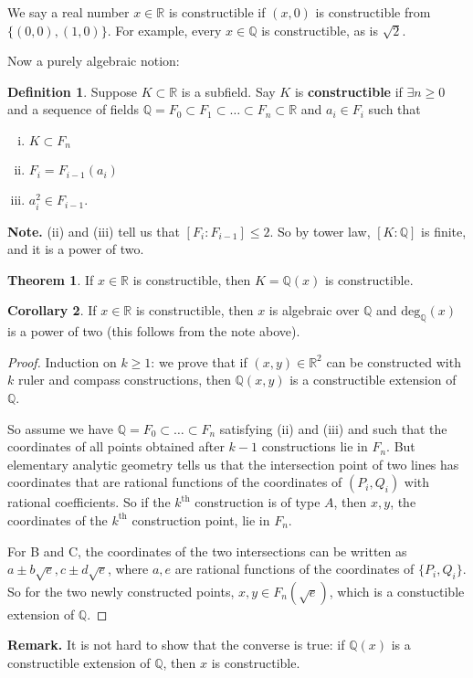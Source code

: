 \documentclass{article}
\theoremstyle{definition}
\newtheorem{theorem}{Theorem}[section]
\newtheorem{cor}[theorem]{Corollary}
\newtheorem{defn}{Definition}[section]
\begin{document}
We say a real number $x \in \mathbb{R}$ is constructible if $(x,0)$ is constructible from $\{(0,0),(1,0)\}$. For example, every $x \in \mathbb{Q}$ is constructible, as is $\sqrt{2}$.
\vspace{1mm}

Now a purely algebraic notion:
\begin{defn}
    Suppose $K \subset \mathbb{R}$ is a subfield. Say $K$ is \textbf{constructible}  if $\exists n\ge 0$ and a sequence of fields $\mathbb{Q}=F_0 \subset F_1 \subset \ldots\subset F_n \subset \mathbb{R}$ and $a_i \in F_i$ such that
    \begin{enumerate}[(i)]
        \item $K \subset F_n$
        \item $F_i = F_{i-1}(a_i)$
        \item $a_i^2 \in F_{i-1}$.
    \end{enumerate}
\end{defn}
\textbf{Note.} (ii) and (iii) tell us that $[F_i : F_{i-1}] \le 2$. So by tower law, $[K : \mathbb{Q}]$ is finite, and it is a power of two.

\begin{theorem}
    If $x \in \mathbb{R}$ is constructible, then $K = \mathbb{Q}(x)$ is constructible.
\end{theorem}
\begin{cor}
    If $x \in \mathbb{R}$ is constructible, then $x$ is algebraic over $\mathbb{Q}$ and $\text{deg}_{\mathbb{Q}}(x)$ is a power of two (this follows from the note above).
\end{cor}
\begin{proof}
    Induction on $k\ge 1$: we prove that if $(x,y) \in \mathbb{R}^2$ can be constructed with $k$ ruler and compass constructions, then $\mathbb{Q}(x,y)$ is a constructible extension of $\mathbb{Q}$.

    So assume we have $\mathbb{Q} = F_0 \subset  \ldots \subset  F_n$ satisfying (ii) and (iii) and such that the coordinates of all points obtained after $k-1$ constructions lie in $F_n$. But elementary analytic geometry tells us that the intersection point of two lines has coordinates that are rational functions of the coordinates of $(P_i,Q_i)$ with rational coefficients. So if the $k^{\text{th}}$ construction is of type $A$, then $x,y$, the coordinates of the $k^{\text{th}}$ construction point, lie in $F_n$.
    \vspace{1mm}

    For B and C, the coordinates of the two intersections can be written as $a \pm b\sqrt{e}, c \pm d\sqrt{e}$, where $a,e$ are rational functions of the coordinates of $\{P_i,Q_i\}$. So for the two newly constructed points, $x,y \in F_n(\sqrt{e})$, which is a constuctible extension of $\mathbb{Q}$.
\end{proof}
\textbf{Remark.} It is not hard to show that the converse is true: if $\mathbb{Q}(x)$ is a constructible extension of $\mathbb{Q}$, then $x$ is constructible.
\vspace{1mm}
\end{document}
